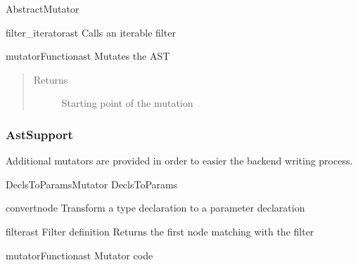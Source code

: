 \documentclass[a4paper,10pt,english]{manual}
\begin{document}
\begin{classdesc}{AbstractMutator}{}
\hypertarget{Backends.Common.Mutators.AbstractMutator.AbstractMutator.filter\_iterator}{}\begin{methoddesc}{filter\_iterator}{ast}
Calls an iterable filter
\end{methoddesc}

\hypertarget{Backends.Common.Mutators.AbstractMutator.AbstractMutator.mutatorFunction}{}\begin{methoddesc}{mutatorFunction}{ast}
Mutates the AST
\begin{quote}\begin{description}
\item[Returns] \leavevmode
Starting point of the mutation

\end{description}\end{quote}
\end{methoddesc}
\end{classdesc}


\subsubsection{AstSupport}

Additional mutators are provided in order to easier the backend writing process.
\hypertarget{module-Backends.Common.Mutators.AstSupport}{}
\modulesynopsis{}

\hypertarget{Backends.Common.Mutators.AstSupport.DeclsToParamsMutator}{}\begin{classdesc}{DeclsToParamsMutator}{}
DeclsToParams

\hypertarget{Backends.Common.Mutators.AstSupport.DeclsToParamsMutator.convert}{}\begin{methoddesc}{convert}{node}
Transform a type declaration to a parameter declaration
\end{methoddesc}

\hypertarget{Backends.Common.Mutators.AstSupport.DeclsToParamsMutator.filter}{}\begin{methoddesc}{filter}{ast}
Filter definition
Returns the first node matching with the filter
\end{methoddesc}

\hypertarget{Backends.Common.Mutators.AstSupport.DeclsToParamsMutator.mutatorFunction}{}\begin{methoddesc}{mutatorFunction}{ast}
Mutator code
\end{methoddesc}
\end{classdesc}
\end{document}
